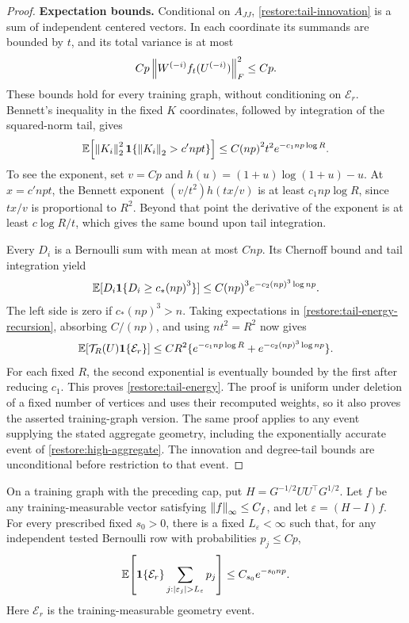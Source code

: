 \begin{proof}
\medskip\noindent\textbf{Expectation bounds.}
Conditional on $A_{JJ}$, \eqref{restore:tail-innovation} is a sum
of independent centered vectors.  In each coordinate its summands
are bounded by $t$, and its total variance is at most
\[
 Cp\left\lVert W^{(-i)}f_t(U^{(-i)})\right\rVert_F^2\le Cp.
\]
These bounds hold for every training graph, without conditioning on
$\mathcal E_r$.  Bennett's inequality in the fixed $K$ coordinates,
followed by integration of the squared-norm tail, gives
\begin{equation}
 \mathbb E\!\left[\left\lVert K_i\right\rVert_2^2
                        \mathbf1\{\left\lVert K_i\right\rVert_2>c'{np}t\}\right]
 \le C{(np)}^2t^2e^{-c_1{np}\log R}.
 \label{restore:tail-innovation-moment}
\end{equation}
To see the exponent, set $v=Cp$ and
$h(u)=(1+u)\log(1+u)-u$.
At $x=c'{np}t$, the Bennett exponent
$(v/t^2)h(tx/v)$ is at least $c_1{np}\log R$, since
$tx/v$ is proportional to $R^2$.
Beyond that point the derivative of the exponent is at least
$c\log R/t$, which gives the same bound upon tail integration.

Every $D_i$ is a Bernoulli sum with mean at most $C{np}$.
Its Chernoff bound and tail integration yield
\begin{equation}
 \mathbb E[D_i\mathbf1\{D_i\ge c_*{(np)}^3\}]
 \le C{(np)}^3e^{-c_2{(np)}^3\log {np}}.
 \label{restore:tail-large-degree-moment}
\end{equation}
The left side is zero if $c_*{(np)}^3>n$.
Taking expectations in \eqref{restore:tail-energy-recursion},
absorbing $C/(np)$, and using $nt^2=R^2$ now gives
\[
 \mathbb E[\mathcal T_R(U)\mathbf1\{\mathcal E_r\}]
 \le CR^2\{e^{-c_1{np}\log R}+e^{-c_2{(np)}^3\log {np}}\}.
\]
For each fixed $R$, the second exponential is eventually bounded by
the first after reducing $c_1$.  This proves
\eqref{restore:tail-energy}.  The proof is uniform under deletion
of a fixed number of vertices and uses their recomputed weights,
so it also proves the asserted training-graph version.
The same proof applies to any event supplying the stated aggregate
geometry, including the exponentially accurate event of
\cref{restore:high-aggregate}. The innovation and degree-tail bounds
are unconditional before restriction to that event.
\end{proof}

\begin{corollary}
\label{restore:tail-hit-corollary}
On a training graph with the preceding cap, put
$H=G^{-1/2}UU^\top G^{1/2}$.
Let $f$ be any training-measurable vector satisfying
$\left\lVert f\right\rVert_\infty\le C_f$, and let $\varepsilon=(H-I)f$.
For every prescribed fixed $s_0>0$, there is a fixed $L_\varepsilon<\infty$
such that, for any independent tested Bernoulli row with probabilities
$p_j\le Cp$,
\begin{equation}
 \E\!\left[\ind{\mathcal E_r}
                 \sum_{j:|\varepsilon_j|>L_\varepsilon}p_j\right]
 \le C_{s_0}e^{-s_0{np}}.
 \label{restore:tail-hit-mass}
\end{equation}
Here $\mathcal E_r$ is the training-measurable geometry event.
\end{corollary}

